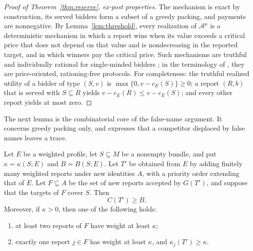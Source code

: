 \documentclass[format=acmsmall, review=false]{acmart}
\begin{document}
\begin{proof}[Proof of Theorem~\ref{thm:reserve}, ex-post
properties]
The mechanism is exact by construction, its served bidders form
a subset of a greedy packing, and payments are nonnegative. By
Lemma~\ref{lem:threshold}, every realization of
\(\mathcal A^{\mu}\) is a deterministic mechanism in which a
report wins when its value exceeds a critical price that does
not depend on that value and is nondecreasing in the reported
target, and in which winners pay the critical price. Such
mechanisms are truthful and individually rational for
single-minded bidders
\citep{lehmann2002truth,mualem2008truthful}; in the terminology
of \citet{yokoo2003characterization}, they are price-oriented,
rationing-free protocols. For completeness: the truthful
realized utility of a bidder of type \((S,v)\) is
\(\max\{0,v-c_E(S)\}\ge0\); a report \((R,b)\) that is served
with \(S\subseteq R\) yields \(v-c_E(R)\le v-c_E(S)\); and every
other report yields at most zero.
\end{proof}

The next lemma is the combinatorial core of the false-name
argument. It concerns greedy packing only, and expresses that a
competitor displaced by false names leaves a trace.

\begin{lemma}[Displacement]
\label{lem:displacement}
Let \(E\) be a weighted profile, let \(S\subseteq M\) be a
nonempty bundle, and put \(\kappa=\kappa(S;E)\) and
\(B=B(S;E)\). Let \(T'\) be obtained from \(E\) by adding
finitely many weighted reports under new identities \(A\), with
a priority order extending that of \(E\). Let \(F\subseteq A\)
be the set of new reports accepted by \(G(T')\), and suppose
that the targets of \(F\) cover \(S\). Then
\begin{equation}\label{eq:C-comparison}
C(T')\ge B.
\end{equation}
Moreover, if \(\kappa>0\), then one of the following holds:
\begin{enumerate}
\item[(a)] at least two reports of \(F\) have weight at least
\(\kappa\);
\item[(b)] exactly one report \(j\in F\) has weight at least
\(\kappa\), and \(\kappa_j(T')\ge\kappa\).
\end{enumerate}
\end{lemma}
\end{document}
